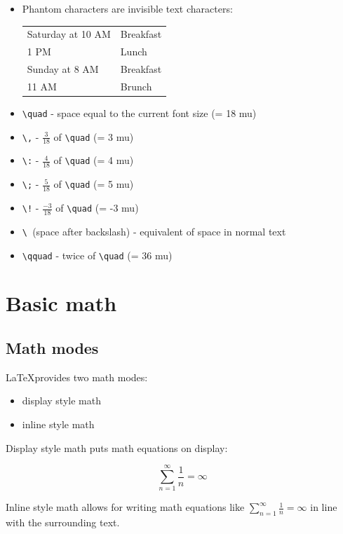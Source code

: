 \documentclass[a4paper]{article}
\newcommand{\sign}[1]{\texttt{\textbackslash{#1}}}
\begin{document}
\begin{itemize}[leftmargin=*]
\item Phantom characters are invisible text characters: 

\begin{tabular}{ll}
     Saturday at 10 AM & Breakfast \\
     \phantom{Saturday at} 1 PM & Lunch \\
     Sunday at 8 AM & Breakfast \\
     \phantom{Sunday at} 11 AM & Brunch \\
\end{tabular}

\item \sign{quad} - space equal to the current font size (= 18 mu)
\item \sign{,} - $\frac{3}{18}$ of \sign{quad} (= 3 mu)
\item \sign{:} - $\frac{4}{18}$ of \sign{quad} (= 4 mu)
\item \sign{;} - $\frac{5}{18}$ of \sign{quad} (= 5 mu)
\item \sign{!} - $\frac{-3}{18}$ of \sign{quad} (= -3 mu)
\item \sign{ }(space after backslash) - equivalent of space in normal text
\item \sign{qquad} - twice of \sign{quad} (= 36 mu)
\end{itemize}


\section{Basic math}

\subsection{Math modes}

\LaTeX provides two math modes: 

\begin{itemize}
    \item display style math
    \item inline style math
\end{itemize}

Display style math puts math equations on display:

$$
\sum_{n=1}^\infty \frac{1}{n} = \infty
$$

Inline style math allows for writing math equations like $\sum_{n=1}^\infty \frac{1}{n} = \infty$ in line with the surrounding text. 

\begin{center}
\end{center}
\end{document}
